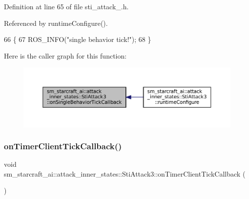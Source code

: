 Definition at line 65 of file sti\+\_\+attack\+\_.\+h.



Referenced by runtime\+Configure().


\begin{DoxyCode}
66   \{
67     ROS\_INFO(\textcolor{stringliteral}{"single behavior tick!"});
68   \}
\end{DoxyCode}
Here is the caller graph for this function\+:
\nopagebreak
\begin{figure}[H]
\begin{center}
\leavevmode
\includegraphics[width=350pt]{structsm__starcraft__ai_1_1attack__inner__states_1_1StiAttack3_a22b5a550554194df779a60d68b101311_icgraph}
\end{center}
\end{figure}
\mbox{\label{structsm__starcraft__ai_1_1attack__inner__states_1_1StiAttack3_afb25dc151281ba1422efe43a7d9e57d7}} 
\subsubsection{\texorpdfstring{on\+Timer\+Client\+Tick\+Callback()}{onTimerClientTickCallback()}}
{\footnotesize\ttfamily void sm\+\_\+starcraft\+\_\+ai\+::attack\+\_\+inner\+\_\+states\+::\+Sti\+Attack3\+::on\+Timer\+Client\+Tick\+Callback (\begin{DoxyParamCaption}{ }\end{DoxyParamCaption})\hspace{0.3cm}{\ttfamily [inline]}}



